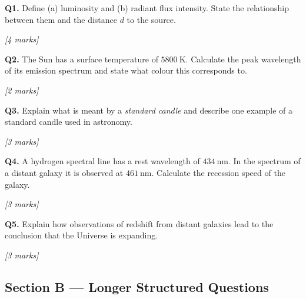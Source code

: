 \begin{tcolorbox}[colback=white, colframe=midblue, breakable]

\begin{minipage}{\linewidth}
\textbf{Q1.} Define (a) luminosity and (b) radiant flux intensity. State the relationship between them and the distance $d$ to the source.
\par\hfill\textit{[4 marks]}
\vspace{3.5cm}
\end{minipage}

\begin{minipage}{\linewidth}
\textbf{Q2.} The Sun has a surface temperature of $5800\ \text{K}$. Calculate the peak wavelength of its emission spectrum and state what colour this corresponds to.
\par\hfill\textit{[2 marks]}
\vspace{2.5cm}
\end{minipage}

\begin{minipage}{\linewidth}
\textbf{Q3.} Explain what is meant by a \emph{standard candle} and describe one example of a standard candle used in astronomy.
\par\hfill\textit{[3 marks]}
\vspace{3.0cm}
\end{minipage}

\begin{minipage}{\linewidth}
\textbf{Q4.} A hydrogen spectral line has a rest wavelength of $434\ \text{nm}$. In the spectrum of a distant galaxy it is observed at $461\ \text{nm}$. Calculate the recession speed of the galaxy.
\par\hfill\textit{[3 marks]}
\vspace{3.0cm}
\end{minipage}

\begin{minipage}{\linewidth}
\textbf{Q5.} Explain how observations of redshift from distant galaxies lead to the conclusion that the Universe is expanding.
\par\hfill\textit{[3 marks]}
\vspace{3.5cm}
\end{minipage}

\end{tcolorbox}

\subsection*{Section B — Longer Structured Questions}

